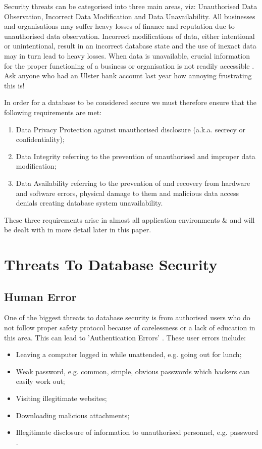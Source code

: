 \documentclass[11pt, twocolumn]{article}
\begin{document}
Security threats can be categorised into three main areas, viz: Unauthorised Data Observation, Incorrect Data Modification and Data Unavailability.  All businesses and organisations may suffer heavy losses of finance and reputation due to unauthorised data observation.  Incorrect modifications of data, either intentional or unintentional, result in an incorrect database state and the use of inexact data may in turn lead to heavy losses.  When data is unavailable, crucial information for the proper functioning of a business or organisation is not readily accessible \cite{BerSand}.  Ask anyone who had an Ulster bank account last year how annoying frustrating this is!  

In order for a database to be considered secure we must therefore ensure that the following requirements are  met:
\begin{enumerate}
\item Data Privacy Protection against unauthorised disclosure (a.k.a. secrecy or confidentiality);  
\item Data Integrity referring to the prevention of unauthorised and improper data modification;
\item Data Availability referring to the prevention of and recovery from hardware and software errors, physical damage to them and malicious data access denials creating database system unavailability.
\end{enumerate}  

These three requirements arise in almost all application environments \cite{BerSand}\&\cite{Thur} and will be dealt with in more detail later in this paper.


\section{Threats To Database Security}
\subsection{Human Error}
One of the biggest threats to database security is from authorised users who do not follow proper safety protocol because of carelessness or a lack of education in this area.  This can lead to 'Authentication Errors' \cite{Thur}.  These user errors include:
\begin{itemize}
\item Leaving a computer logged in while unattended, e.g. going out for lunch;
\item Weak password, e.g. common, simple, obvious passwords which hackers can easily work out;
\item Visiting illegitimate websites;
\item Downloading malicious attachments;
\item Illegitimate disclosure of information to unauthorised personnel, e.g. password \cite{Bas}.
\end{itemize}
\end{document}
